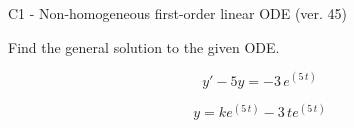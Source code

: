 \begin{exercise}
  \begin{exerciseTitle}C1 - Non-homogeneous first-order linear ODE (ver. 45)\end{exerciseTitle}
  \begin{exerciseStatement}
    
Find the general solution to the given ODE.

    
\[y'-5y= -3 \, e^{\left(5 \, t\right)}\]

  \end{exerciseStatement}
  \begin{exerciseAnswer}
    
\[y= k e^{\left(5 \, t\right)} - 3 \, t e^{\left(5 \, t\right)}\]

  \end{exerciseAnswer}
\end{exercise}